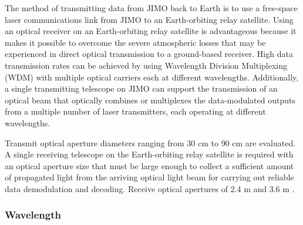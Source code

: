 The method of transmitting data from JIMO back to Earth is to use a free-space laser communications link from JIMO to an Earth-orbiting relay satellite. Using an optical receiver on an Earth-orbiting relay satellite is advantageous because it makes it possible to overcome the severe  atmospheric losses that may be experienced in direct optical transmission to a ground-based receiver. High data transmission rates can be achieved by using Wavelength Division Multiplexing (WDM) with multiple optical carriers each at different wavelengths. Additionally, a single transmitting telescope on JIMO can support the transmission of an optical beam that optically combines or multiplexes the data-modulated outputs from a multiple number of laser transmitters, each operating at different wavelengths.

Transmit optical aperture diameters ranging from 30 cm to 90 cm are evaluated. A single receiving telescope on the Earth-orbiting relay satellite is required with an optical aperture size that must be large enough to collect a sufficient amount of propagated light from the arriving optical light beam for carrying out reliable data demodulation and decoding. Receive optical apertures of 2.4 m and 3.6 m \cite{lasercom} .

\subsubsection{Wavelength}

